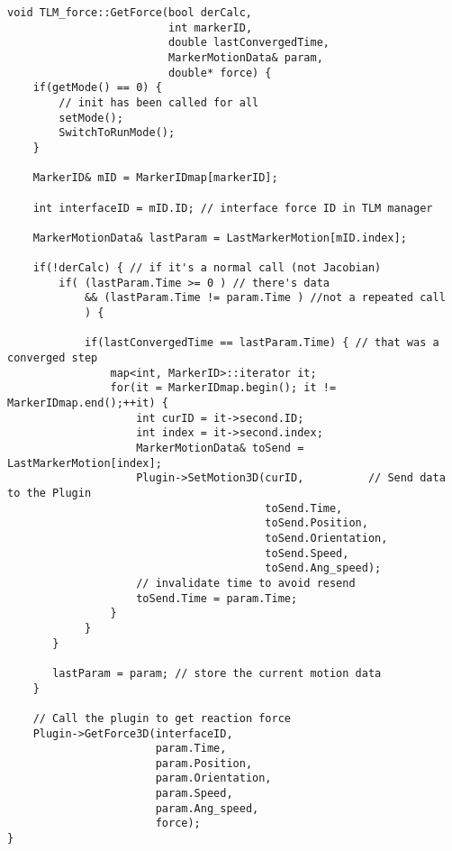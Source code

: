 {
\scriptsize
\begin{verbatim}
void TLM_force::GetForce(bool derCalc,
                         int markerID,
                         double lastConvergedTime,
                         MarkerMotionData& param,
                         double* force) {
    if(getMode() == 0) {
        // init has been called for all
        setMode();
        SwitchToRunMode();
    }

    MarkerID& mID = MarkerIDmap[markerID];

    int interfaceID = mID.ID; // interface force ID in TLM manager

    MarkerMotionData& lastParam = LastMarkerMotion[mID.index];

    if(!derCalc) { // if it's a normal call (not Jacobian)
        if( (lastParam.Time >= 0 ) // there's data
            && (lastParam.Time != param.Time ) //not a repeated call
            ) {
	
            if(lastConvergedTime == lastParam.Time) { // that was a converged step
                map<int, MarkerID>::iterator it;
                for(it = MarkerIDmap.begin(); it != MarkerIDmap.end();++it) {
                    int curID = it->second.ID;
                    int index = it->second.index;
                    MarkerMotionData& toSend = LastMarkerMotion[index];
                    Plugin->SetMotion3D(curID,          // Send data to the Plugin
                                        toSend.Time,
                                        toSend.Position,
                                        toSend.Orientation,
                                        toSend.Speed,
                                        toSend.Ang_speed);
                    // invalidate time to avoid resend
                    toSend.Time = param.Time;
                }
            }
       }

       lastParam = param; // store the current motion data
    }

    // Call the plugin to get reaction force
    Plugin->GetForce3D(interfaceID,
                       param.Time,
                       param.Position,
                       param.Orientation,
                       param.Speed,
                       param.Ang_speed,
                       force);
}

\end{verbatim}
}



